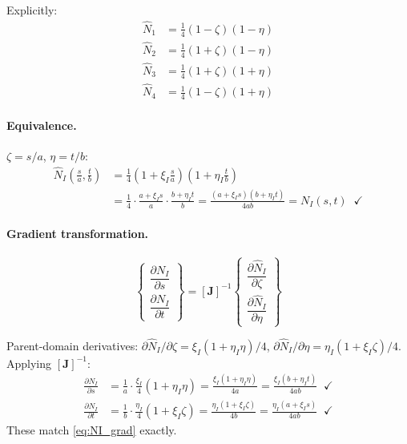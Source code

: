 \documentclass[11pt, a4paper]{article}
\begin{document}
Explicitly:
\begin{align*}
\hat{N}_1 &= \tfrac{1}{4}(1-\zeta)(1-\eta) \\[3pt]
\hat{N}_2 &= \tfrac{1}{4}(1+\zeta)(1-\eta) \\[3pt]
\hat{N}_3 &= \tfrac{1}{4}(1+\zeta)(1+\eta) \\[3pt]
\hat{N}_4 &= \tfrac{1}{4}(1-\zeta)(1+\eta)
\end{align*}

\paragraph{Equivalence.}
$\zeta=s/a$, $\eta=t/b$:
\begin{align*}
\hat{N}_I\!\left(\frac{s}{a},\frac{t}{b}\right)
&= \frac{1}{4}\!\left(1+\xi_I\frac{s}{a}\right)\!\!\left(1+\eta_I\frac{t}{b}\right) \\[6pt]
&= \frac{1}{4}\cdot\frac{a+\xi_I s}{a}\cdot\frac{b+\eta_I t}{b}
 = \frac{(a+\xi_I s)(b+\eta_I t)}{4ab}
 = N_I(s,t)\;\;\checkmark
\end{align*}

\paragraph{Gradient transformation.}
\begin{equation}\label{eq:grad_transform}
\begin{Bmatrix}
\dfrac{\partial N_I}{\partial s} \\[10pt]
\dfrac{\partial N_I}{\partial t}
\end{Bmatrix}
= [\mathbf{J}]^{-1}
\begin{Bmatrix}
\dfrac{\partial \hat{N}_I}{\partial\zeta} \\[10pt]
\dfrac{\partial \hat{N}_I}{\partial\eta}
\end{Bmatrix}
\end{equation}

Parent-domain derivatives: $\partial\hat{N}_I/\partial\zeta=\xi_I(1+\eta_I\eta)/4$, $\partial\hat{N}_I/\partial\eta=\eta_I(1+\xi_I\zeta)/4$.  Applying $[\mathbf{J}]^{-1}$:
\begin{align*}
\frac{\partial N_I}{\partial s}
&= \frac{1}{a}\cdot\frac{\xi_I}{4}(1+\eta_I\eta)
 = \frac{\xi_I(1+\eta_I\eta)}{4a}
 = \frac{\xi_I(b+\eta_I t)}{4ab}\;\;\checkmark \\[6pt]
\frac{\partial N_I}{\partial t}
&= \frac{1}{b}\cdot\frac{\eta_I}{4}(1+\xi_I\zeta)
 = \frac{\eta_I(1+\xi_I\zeta)}{4b}
 = \frac{\eta_I(a+\xi_I s)}{4ab}\;\;\checkmark
\end{align*}
These match \cref{eq:NI_grad} exactly.
\end{document}
